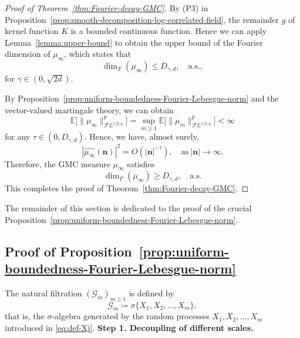 \documentclass[12pt]{amsart}
\theoremstyle{definition}
\theoremstyle{remark}
\newcommand{\E}{\mathbb{E}}
\numberwithin{equation}{section}
\begin{document}
\begin{proof}[Proof of Theorem~\ref{thm:Fourier-decay-GMC}]
By (P3) in Proposition~\ref{prop:smooth-decomposition-log-correlated-field}, the remainder $g$ of kernel function $K$ is a bounded continuous function. Hence we can apply Lemma~\ref{lemma:upper-bound} to obtain the upper bound of the Fourier dimension of $\mu_\infty$, which states that 
\[
\operatorname{dim}_F(\mu_\infty)\le D_{\gamma,d},\quad \text{a.s.},
\]
for $\gamma\in (0,\sqrt{2d})$. 

By Proposition~\ref{prop:uniform-boundedness-Fourier-Lebesgue-norm} and the vector-valued martingale theory, we can obtain
\[
\E\big[\|\mu_\infty\|_{\mathcal{F}L^{\tau/2,q}}^p\big]=\sup_{m\ge 1}\E\big[\|\mu_m\|_{\mathcal{F}L^{\tau/2,q}}^p\big]<\infty
\]
for any $\tau\in (0,D_{\gamma,d})$. Hence, we have, almost surely,
\[
|\widehat{\mu_\infty}(\boldsymbol{n})|^2=O(|\boldsymbol{n}|^{-\tau}),\quad \text{as}~|\boldsymbol{n}|\to \infty.
\] 
Therefore, the GMC measure $\mu_\infty$ satisfies
\[
\operatorname{dim}_F(\mu_\infty)\ge D_{\gamma,d},\quad \text{a.s.}
\]
This completes the proof of Theorem~\ref{thm:Fourier-decay-GMC}.
\end{proof}

The remainder of this section is dedicated to the proof of the crucial Proposition~\ref{prop:uniform-boundedness-Fourier-Lebesgue-norm}.

\subsection{Proof of Proposition~\ref{prop:uniform-boundedness-Fourier-Lebesgue-norm}}\label{ssec:proof-uniform-bdn}

The natural filtration $(\mathscr{G}_{m})_{m\ge 1}$ is defined by
\[
\mathscr{G}_m\coloneq \sigma\{X_1,X_2,\ldots,X_m\},
\]
that is, the $\sigma$-algebra generated by the random processes $X_1,X_2,\ldots,X_m$ introduced in \eqref{eq:def-Xj}.
\medskip
{\flushleft \bf Step 1. Decoupling of different scales.}
\medskip
\end{document}

